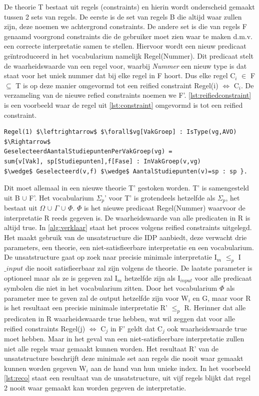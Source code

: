 De theorie T bestaat uit regels (constraints) en hierin wordt onderscheid gemaakt tussen 2 sets van regels. De eerste is de set van regels B die altijd waar zullen zijn, deze noemen we achtergrond constraints. De andere set is die van regels F genaamd voorgrond constraints die de gebruiker moet zien waar te maken d.m.v. een correcte interpretatie samen te stellen. Hiervoor wordt een nieuw predicaat ge\"{i}ntroduceerd in het vocabularium namelijk Regel(Nummer). Dit predicaat stelt de waarheidswaarde van een regel voor, waarbij \textit{Nummer} een nieuw type is dat staat voor het uniek nummer dat bij elke regel in F hoort. Dus elke regel  C$_{i}$ $\in$ F $\subseteq$ T is op deze manier omgevormd tot een reified constraint Regel(i) $\Leftrightarrow$ C$_{i}$. De verzameling van de nieuwe refied constraints noemen we F'. \ref{lst:reifiedconstraint} is een voorbeeld waar de regel uit \ref{lst:constraint} omgevormd is tot een reified constraint.
\lstset{basicstyle=\scriptsize}
\begin{lstlisting}[mathescape, caption=Voorbeeld reified constraint IDP\label{lst:reifiedconstraint}, frame=single]
Regel(1) $\leftrightarrow$ $\forall$vg[VakGroep] : IsType(vg,AVO) $\Rightarrow$ 
GeselecteerdAantalStudiepuntenPerVakGroep(vg) = 
sum{v[Vak], sp[Studiepunten],f[Fase] : InVakGroep(v,vg) 
$\wedge$ Geselecteerd(v,f) $\wedge$ AantalStudiepunten(v)=sp : sp }.
\end{lstlisting}
Dit moet allemaal in een nieuwe theorie T' gestoken worden. T' is samengesteld uit B $\cup$ F'. Het vocabularium $\Sigma_{p}$' voor T' is grotendeels hetzelfde als $\Sigma_{p}$, het bestaat uit $\Omega$ $\cup$ $\Gamma$ $\cup$ $\Phi$. $\Phi$ is het nieuwe predicaat Regel(Nummer) waarvoor de interpretatie R reeds gegeven is. De waarheidswaarde van alle predicaten in R is altijd true. In \ref{alg:verklaar} staat het proces volgens reified constraints uitgelegd. Het maakt gebruik van de unsatstructure die IDP aanbiedt, deze verwacht drie parameters, een theorie, een niet-satisfieerbare interpretatie en een vocabularium. De unsatstructure gaat op zoek naar precisie minimale interpretatie I$_{m}$ $\leq_{p}$ I$\_{input}$ die nooit satisfieerbaar zal zijn volgens de theorie. De laatste parameter is optioneel maar als ze is gegeven zal I$_{m}$ hetzelfde zijn als I$_{input}$ voor alle predicaat symbolen die niet in het vocabularium zitten. Door het vocabularium $\Phi$ als parameter mee te geven zal de output hetzelfde zijn voor W$_{i}$ en G, maar voor R is het resultaat een precisie minimale interpretatie R' $\leq_{p}$ R. Herinner dat alle predicaten in R waarheidswaarde true hebben, wat wil zeggen dat voor alle reified constraints Regel(j) $\Leftrightarrow$ C$_{j}$ in F' geldt dat C$_{j}$ ook waarheidswaarde true moet hebben. Maar in het geval van een niet-satisfieerbare interpretatie zullen niet alle regels waar gemaakt kunnen worden. Het resultaat R' van de unsatstructure beschrijft deze minimale set aan regels die nooit waar gemaakt kunnen worden gegeven W$_{i}$ aan de hand van hun unieke index. In het voorbeeld \ref{lst:reco} staat een resultaat van de unsatstructure, uit vijf regels blijkt dat regel 2 nooit waar gemaakt kan worden gegeven de interpretatie.

